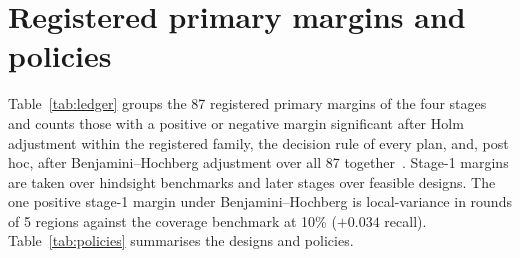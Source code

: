 \documentclass[10pt]{article}
\newcommand{\fittable}[1]{\resizebox{\ifdim\width>\linewidth\linewidth\else\width\fi}{!}{#1}}
\begin{document}
\begin{table}[H]
\centering
\caption{Registered primary margins with the registered bootstrap interval and the sign-flip inversion interval.}
\label{tab:robust_intervals}
\fittable{\small}
\end{table}

\begin{table}[H]
\centering
\caption{Registered primary margins with and without the development slide TENX174; $p_H$ Holm-adjusted within
each family over 17 studies.}
\label{tab:robust_devslide}
\fittable{\small}
\end{table}

\section{Registered primary margins and policies}
\label{app:ledger}

Table~\ref{tab:ledger} groups the 87 registered primary margins of the four stages and counts those with a positive
or negative margin significant after Holm adjustment within the registered family, the decision rule of every
plan, and, post hoc, after Benjamini--Hochberg adjustment over all 87 together~\citep{benjamini1995controlling}.
Stage-1 margins are taken over hindsight benchmarks and later stages over feasible designs. The one positive stage-1
margin under Benjamini--Hochberg is local-variance in rounds of 5 regions against the coverage benchmark at 10\%
($+0.034$ recall). Table~\ref{tab:policies} summarises the designs and policies.

\begin{table}[H]
\centering
\caption{Every registered primary margin, grouped by comparison. ``$+$'' and ``$-$'' count margins with a positive
or negative mean and adjusted $p<0.05$: Holm within the registered family (24, 18, 20, and 12, 9, 4 margins), or
Benjamini--Hochberg over all 87 (post hoc).}
\label{tab:ledger}
\fittable{\small}
\end{table}
\end{document}
